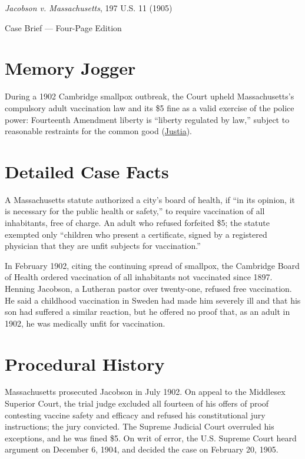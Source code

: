 \documentclass[12pt]{article}
\begin{document}
\begin{center}
{\LARGE \textit{Jacobson v. Massachusetts}, 197 U.S. 11 (1905)\par}
\vspace{0.8em}
{\large Case Brief --- Four-Page Edition\par}
\end{center}
\vspace{1em}

\section{Memory Jogger}

During a 1902 Cambridge smallpox outbreak, the Court upheld Massachusetts's compulsory adult vaccination law and its \$5 fine as a valid exercise of the police power: Fourteenth Amendment liberty is ``liberty regulated by law,'' subject to reasonable restraints for the common good (\href{https://supreme.justia.com/cases/federal/us/197/11/}{Justia}).

\section{Detailed Case Facts}

A Massachusetts statute authorized a city's board of health, if ``in its opinion, it is necessary for the public health or safety,'' to require vaccination of all inhabitants, free of charge. An adult who refused forfeited \$5; the statute exempted only ``children who present a certificate, signed by a registered physician that they are unfit subjects for vaccination.''

In February 1902, citing the continuing spread of smallpox, the Cambridge Board of Health ordered vaccination of all inhabitants not vaccinated since 1897. Henning Jacobson, a Lutheran pastor over twenty-one, refused free vaccination. He said a childhood vaccination in Sweden had made him severely ill and that his son had suffered a similar reaction, but he offered no proof that, as an adult in 1902, he was medically unfit for vaccination.

\section{Procedural History}

Massachusetts prosecuted Jacobson in July 1902. On appeal to the Middlesex Superior Court, the trial judge excluded all fourteen of his offers of proof contesting vaccine safety and efficacy and refused his constitutional jury instructions; the jury convicted. The Supreme Judicial Court overruled his exceptions, and he was fined \$5. On writ of error, the U.S. Supreme Court heard argument on December 6, 1904, and decided the case on February 20, 1905.
\end{document}
